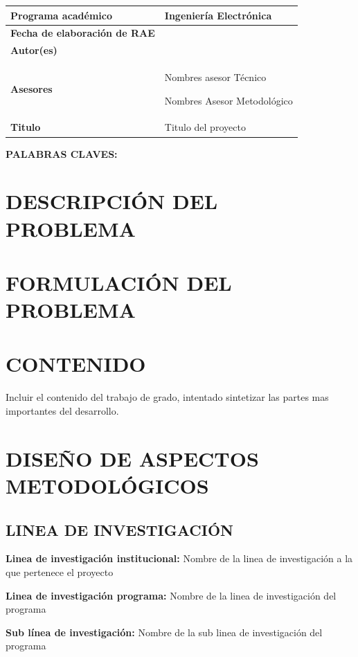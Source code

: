 \documentclass[12pt]{aunarAPA}
\begin{document}
\begin{RAE}

\begin{table}[!h]
    \centering
    \begin{tabular}{|p{6cm}|p{9cm}|}
    \hline
         \textbf{Programa académico} & Ingeniería Electrónica  \\\hline
         \textbf{Fecha de elaboración de RAE} &   \\\hline
         \textbf{Autor(es)} &   \\\hline
         \textbf{Asesores} &  Nombres asesor Técnico\par Nombres Asesor Metodológico \\\hline
         \textbf{Titulo} &  Titulo del proyecto\\\hline
    \end{tabular}
\end{table}

\textbf{PALABRAS CLAVES:} 

\clearpage
\section*{DESCRIPCIÓN DEL PROBLEMA}

\section*{FORMULACIÓN DEL PROBLEMA}

\section*{CONTENIDO}
Incluir el contenido del trabajo de grado, intentado sintetizar las partes mas importantes del desarrollo.
\section*{DISEÑO DE ASPECTOS METODOLÓGICOS}

\subsection*{LINEA DE INVESTIGACIÓN}
\textbf{Linea de investigación institucional:} Nombre de la linea de investigación a la que pertenece el proyecto

\textbf{Linea de investigación programa:} Nombre de la linea de investigación del programa

\textbf{Sub línea de investigación:} Nombre de la sub linea de investigación del programa


\end{RAE}
\end{document}
